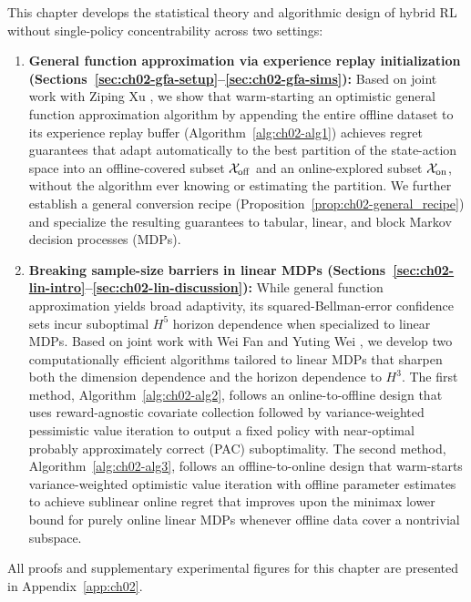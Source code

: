 \begin{aigenblock}
This chapter develops the statistical theory and algorithmic design of hybrid RL without single-policy concentrability across two settings:
\begin{enumerate}
    \item \textbf{General function approximation via experience replay initialization (Sections~\ref{sec:ch02-gfa-setup}--\ref{sec:ch02-gfa-sims}):} Based on joint work with Ziping Xu \citep{tan2024natural}, we show that warm-starting an optimistic general function approximation algorithm by appending the entire offline dataset to its experience replay buffer (Algorithm~\ref{alg:ch02-alg1}) achieves regret guarantees that adapt automatically to the best partition of the state-action space into an offline-covered subset ${\mathcal{X}}_{{\operatorname{off}}}$ and an online-explored subset ${\mathcal{X}}_{{\operatorname{on}}}$, without the algorithm ever knowing or estimating the partition. We further establish a general conversion recipe (Proposition~\ref{prop:ch02-general_recipe}) and specialize the resulting guarantees to tabular, linear, and block Markov decision processes (MDPs).
    \item \textbf{Breaking sample-size barriers in linear MDPs (Sections~\ref{sec:ch02-lin-intro}--\ref{sec:ch02-lin-discussion}):} While general function approximation yields broad adaptivity, its squared-Bellman-error confidence sets incur suboptimal $H^5$ horizon dependence when specialized to linear MDPs. Based on joint work with Wei Fan and Yuting Wei \citep{tan2024hybrid}, we develop two computationally efficient algorithms tailored to linear MDPs that sharpen both the dimension dependence and the horizon dependence to $H^3$. The first method, Algorithm~\ref{alg:ch02-alg2}, follows an online-to-offline design that uses reward-agnostic covariate collection \citep{wagenmaker2022instance} followed by variance-weighted pessimistic value iteration \citep{xiong2023nearly} to output a fixed policy with near-optimal probably approximately correct (PAC) suboptimality. The second method, Algorithm~\ref{alg:ch02-alg3}, follows an offline-to-online design that warm-starts variance-weighted optimistic value iteration \citep{he2023nearly} with offline parameter estimates to achieve sublinear online regret that improves upon the minimax lower bound for purely online linear MDPs whenever offline data cover a nontrivial subspace.
\end{enumerate}
All proofs and supplementary experimental figures for this chapter are presented in Appendix~\ref{app:ch02}.


\end{aigenblock}

